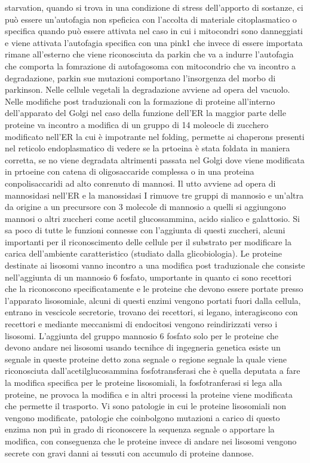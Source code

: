 starvation, quando si trova in una condizione di stress dell'apporto di sostanze, ci pu\`o essere un'autofagia non speficica con l'accolta di materiale citoplasmatico o specifica quando 
pu\`o essere attivata nel caso in cui i mitocondri sono danneggiati e viene attivata l'autofagia specifica con una pink1 che invece di essere importata rimane all'esterno che viene
riconosciuta da parkin che va a indurre l'autofagia che comporta la fomrazione di autofagosoma con mitocondrio che va incontro a degradazione, parkin sue mutazioni comportano
l'insorgenza del morbo di parkinson. Nelle cellule vegetali la degradazione avviene ad opera del vacuolo. Nelle modifiche post traduzionali con la formazione di proteine all'interno
dell'apparato del Golgi nel caso della funzione dell'ER la maggior parte delle proteine va incontro a modifica di un gruppo di 14 moleocle di zucchero modificato nell'ER la cui \`e 
impotrante nel folding, permette ai chaperons presenti nel reticolo endoplasmatico di vedere se la prtoeina \`e stata foldata in maniera corretta, se no viene degradata altrimenti 
passata nel Golgi dove viene modificata in prtoeine con catena di oligosaccaride complessa o in una proteina conpolisaccaridi ad alto conrenuto di mannosi. Il utto avviene ad opera di 
mannosidasi nell'ER e la manossidasi I rimuove tre gruppi di mannosio e un'altra da origine a un precursore con 3 molecole di mannosio a quelli si aggiungono mannosi o altri zuccheri 
come acetil glucossammina, acido sialico e galattosio. Si sa poco di tutte le funzioni connesse con l'aggiunta di questi zuccheri, alcuni importanti per il riconoscimento delle 
cellule per il substrato per modificare la carica dell'ambiente caratteristico (studiato dalla glicobiologia). Le proteine destinate ai lisosomi vanno incontro a una modifica post
traduzionale che consiste nell'aggiunta di un mannosio 6 fosfato, umportante in quanto ci sono recettori che la riconoscono specificatamente e le proteine che devono essere portate 
presso l'apparato lisosomiale, alcuni di questi enzimi vengono portati fuori dalla cellula, entrano in vescicole secretorie, trovano dei recettori, si legano, interagiscono con recettori 
e mediante meccanismi di endocitosi vengono reindirizzati verso i lisosomi. L'aggiunta del gruppo mannosio 6 fosfato solo per le proteine che devono andare nei lisosomi usando tecnihce
di ingegneria genetica esiste un segnale in queste proteine detto zona segnale o regione segnale la quale viene riconosciuta dall'acetilglucosammina fosfotransferasi che \`e quella
deputata a fare la modifica specifica per le proteine lisosomiali, la fosfotranferasi si lega alla proteine, ne provoca la modifica e in altri processi la proteine viene modificata che
permette il trasporto. Vi sono patologie in cui le proteine lisosomiali non vengono modificate, patologie che coinbolgono mutazioni a carico di questo enzima non pu\`i in grado di 
riconoscere la sequenza segnale o apportare la modifica, con conseguenza che le proteine invece di andare nei lisosomi vengono secrete con gravi danni ai tessuti con accumulo di proteine
dannose. 
